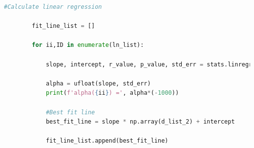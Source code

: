 \documentclass[a4paper,11pt]{article}
\begin{document}
\begin{lstlisting}[language=Python, basicstyle=\tiny, breaklines=true, postbreak=\mbox{\textbackslashspace}]
        #Calculate linear regression

        fit_line_list = []

        for ii,ID in enumerate(ln_list):

            slope, intercept, r_value, p_value, std_err = stats.linregress(d_list_2, ID)

            alpha = ufloat(slope, std_err)
            print(f'alpha({ii}) =', alpha*(-1000))

            #Best fit line 
            best_fit_line = slope * np.array(d_list_2) + intercept

            fit_line_list.append(best_fit_line)
    \end{lstlisting}
\end{document}
